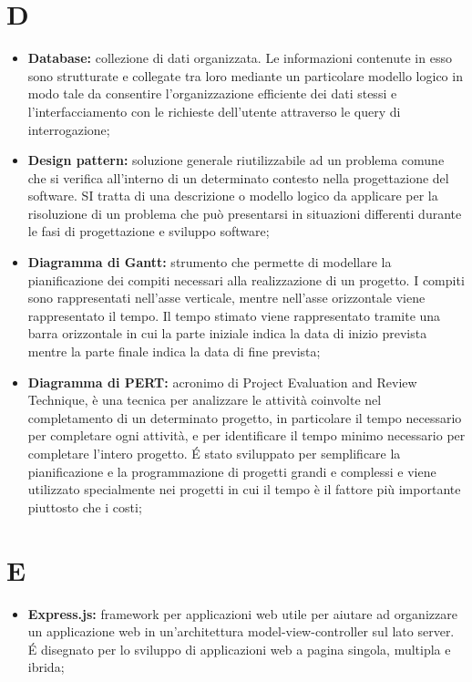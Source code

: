 \section*{D} %
\label{sec:d}
	\begin{itemize}
		\item \textbf{Database:} collezione di dati organizzata. Le informazioni contenute in esso sono strutturate e collegate tra loro mediante un particolare modello logico in modo tale da consentire l'organizzazione efficiente dei dati stessi e l'interfacciamento con le richieste dell'utente attraverso le query di interrogazione;
		\item \textbf{Design pattern:} soluzione generale riutilizzabile ad un problema comune che si verifica all'interno di un determinato contesto nella progettazione del software. SI tratta di una descrizione o modello logico da applicare per la risoluzione di un problema che può presentarsi in situazioni differenti durante le fasi di progettazione e sviluppo software;
		\item \textbf{Diagramma di Gantt:} strumento che permette di modellare la pianificazione dei compiti necessari alla realizzazione di un progetto. I compiti sono rappresentati nell'asse verticale, mentre nell'asse orizzontale viene rappresentato il tempo. Il tempo stimato viene rappresentato tramite una barra orizzontale in cui la parte iniziale indica la data di inizio prevista mentre la parte finale indica la data di fine prevista;
		\item \textbf{Diagramma di PERT:} acronimo di Project Evaluation and Review Technique, è una tecnica per analizzare le attività coinvolte nel completamento di un determinato progetto, in particolare il tempo necessario per completare ogni attività, e per identificare il tempo minimo necessario per completare l'intero progetto. É stato sviluppato per semplificare la pianificazione e la programmazione di progetti grandi e complessi e viene utilizzato specialmente nei progetti in cui il tempo è il fattore più importante piuttosto che i costi;
	\end{itemize}
\pagebreak

\section*{E} %
\label{sec:e}
	\begin{itemize}
		\item \textbf{Express.js:} framework per applicazioni web utile per aiutare ad organizzare un applicazione web in un'architettura model-view-controller sul lato server. É disegnato per lo sviluppo di applicazioni web a pagina singola, multipla e ibrida;
	\end{itemize}
\pagebreak
